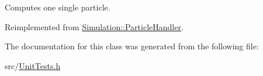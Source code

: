 Computes one single particle. 



Reimplemented from \hyperlink{classSimulation_1_1ParticleHandler_a6b1fc310603bc10093d50c674097fd25}{Simulation\-::\-Particle\-Handler}.



The documentation for this class was generated from the following file\-:\begin{DoxyCompactItemize}
\item 
src/\hyperlink{UnitTests_8h}{Unit\-Tests.\-h}\end{DoxyCompactItemize}

